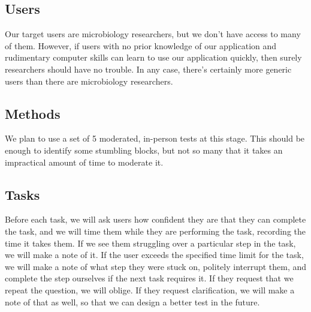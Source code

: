 \documentclass[letterpaper,10pt, onecolumn]{IEEEtran}
\begin{document}
\subsection*{Users}

Our target users are microbiology researchers, but we don't have access to many of them. However, if users with no prior knowledge of our application and rudimentary computer skills can learn to use our application quickly, then surely researchers should have no trouble. In any case, there's certainly more generic users than there are microbiology researchers.

\subsection*{Methods}

We plan to use a set of 5 moderated, in-person tests at this stage. This should be enough to identify some stumbling blocks, but not so many that it takes an impractical amount of time to moderate it.

\subsection*{Tasks}

Before each task, we will ask users how confident they are that they can complete the task, and we will time them while they are performing the task, recording the time it takes them. If we see them struggling over a particular step in the task, we will make a note of it. If the user exceeds the specified time limit for the task, we will make a note of what step they were stuck on, politely interrupt them, and complete the step ourselves if the next task requires it. If they request that we repeat the question, we will oblige. If they request clarification, we will make a note of that as well, so that we can design a better test in the future.
\end{document}
